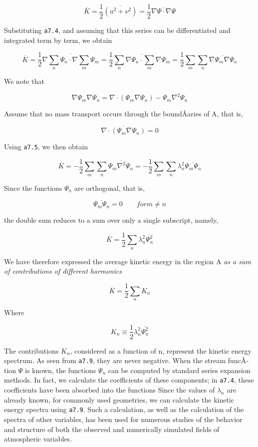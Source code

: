 {\[\overline{K} = \frac{1}{2}\overline{( u^{2} + \nu^{2} ) } = \frac{1}{2}\overline{\nabla\Psi\cdot\nabla\Psi}\]}

Substituting \texttt{a7.4}, and assuming that this series can be
differentiated and integrated term by term, we obtain

\[\overline{K} = \frac{1}{2}\overline{ \nabla \sum_n\Psi_n\cdot\nabla\sum_m \Psi_m }
= \frac{1}{2}\overline{  \sum_n\nabla\Psi_n\cdot\sum_m \nabla\Psi_m }
= \frac{1}{2}\sum_m\sum_n \overline{ \nabla\Psi_m \nabla\Psi_n }\]

We note that

\[\nabla\Psi_m \nabla\Psi_n =\nabla \cdot \left( \Psi_m\nabla\Psi_n \right) - \Psi_m\nabla^2\Psi_n\]

Assume that no mass transport occurs through the boundÂ­aries of A, that
is,

\[\overline{\nabla\cdot\left( \Psi_{m}\nabla\Psi_{n} \right)} = 0\]

Using \texttt{a7.5}, we then obtain

\[\overline{K} = -\frac{1}{2}\sum_m\sum_n \overline{ \Psi_m \nabla^2\Psi_n }
= -\frac{1}{2}\sum_m\sum_n \lambda_n^2\overline{ \Psi_m \Psi_n }\]

Since the functions \(\Psi_{n}\) are orthogonal, that is,

\[\overline{ \Psi_m \Psi_n } = 0 \qquad for m \neq n\]

the double sum reduces to a sum over only a single subscript, namely,

\[\overline{K} = \frac{1}{2}\sum_{n}\lambda_{n}^{2}\overline{\Psi_n^2}\]

We have therefore expressed the average kinetic energy in the region A
\emph{as a sum of contributions of different harmonics}

{\[\overline{K} = \frac{1}{2}\sum_{n}K_n\]}

Where

{\[K_{n} \equiv \frac{1}{2}\lambda_{n}^{2}\overline{\Psi_n^2}\]}

The contributions \(K_{n}\), considered as a function of n, represent
the kinetic energy spectrum. As seen from \texttt{a7.9}, they are never
negative. When the stream funcÂ­tion \(\Psi\) is known, the functions
\(\Psi_{n}\) can be computed by standard series expansion methods. In
fact, we calculate the coefficients of these components; in
\texttt{a7.4}, these coefficients have been absorbed into the functions
Since the values of \(\lambda_{n}\) are already known, for commonly used
geometries, we can calculate the kinetic energy spectra using
\texttt{a7.9}. Such a calculation, as well as the calculation of the
spectra of other variables, has been used for numerous studies of the
behavior and structure of both the observed and numerically simulated
fields of atmospheric variables.

